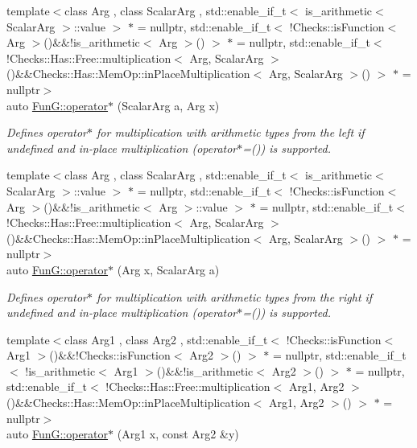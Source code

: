 \begin{DoxyCompactItemize}
{\footnotesize template$<$class Arg , class Scalar\-Arg , std\-::enable\-\_\-if\-\_\-t$<$ is\-\_\-arithmetic$<$ Scalar\-Arg $>$\-::value $>$ $\ast$  = nullptr, std\-::enable\-\_\-if\-\_\-t$<$ !\-Checks\-::is\-Function$<$ Arg $>$()\&\&!is\-\_\-arithmetic$<$ Arg $>$() $>$ $\ast$  = nullptr, std\-::enable\-\_\-if\-\_\-t$<$ !\-Checks\-::\-Has\-::\-Free\-::multiplication$<$ Arg, Scalar\-Arg $>$()\&\&\-Checks\-::\-Has\-::\-Mem\-Op\-::in\-Place\-Multiplication$<$ Arg, Scalar\-Arg $>$() $>$ $\ast$  = nullptr$>$ }\\auto \hyperlink{namespaceFunG_a9b303ce8718a6f64b035e7e782370734}{\-Fun\-G\-::operator$\ast$} (\-Scalar\-Arg a, \-Arg x)
\begin{DoxyCompactList}\small\item\em \-Defines operator$\ast$ for multiplication with arithmetic types from the left if undefined and in-\/place multiplication (operator$\ast$=()) is supported. \end{DoxyCompactList}\item 
{\footnotesize template$<$class Arg , class Scalar\-Arg , std\-::enable\-\_\-if\-\_\-t$<$ is\-\_\-arithmetic$<$ Scalar\-Arg $>$\-::value $>$ $\ast$  = nullptr, std\-::enable\-\_\-if\-\_\-t$<$ !\-Checks\-::is\-Function$<$ Arg $>$()\&\&!is\-\_\-arithmetic$<$ Arg $>$\-::value $>$ $\ast$  = nullptr, std\-::enable\-\_\-if\-\_\-t$<$ !\-Checks\-::\-Has\-::\-Free\-::multiplication$<$ Arg, Scalar\-Arg $>$()\&\&\-Checks\-::\-Has\-::\-Mem\-Op\-::in\-Place\-Multiplication$<$ Arg, Scalar\-Arg $>$() $>$ $\ast$  = nullptr$>$ }\\auto \hyperlink{namespaceFunG_a3cd5a2cb1abba842154691bb84aab896}{\-Fun\-G\-::operator$\ast$} (\-Arg x, \-Scalar\-Arg a)
\begin{DoxyCompactList}\small\item\em \-Defines operator$\ast$ for multiplication with arithmetic types from the right if undefined and in-\/place multiplication (operator$\ast$=()) is supported. \end{DoxyCompactList}\item 
{\footnotesize template$<$class Arg1 , class Arg2 , std\-::enable\-\_\-if\-\_\-t$<$ !\-Checks\-::is\-Function$<$ Arg1 $>$()\&\&!\-Checks\-::is\-Function$<$ Arg2 $>$() $>$ $\ast$  = nullptr, std\-::enable\-\_\-if\-\_\-t$<$ !is\-\_\-arithmetic$<$ Arg1 $>$()\&\&!is\-\_\-arithmetic$<$ Arg2 $>$() $>$ $\ast$  = nullptr, std\-::enable\-\_\-if\-\_\-t$<$ !\-Checks\-::\-Has\-::\-Free\-::multiplication$<$ Arg1, Arg2 $>$()\&\&\-Checks\-::\-Has\-::\-Mem\-Op\-::in\-Place\-Multiplication$<$ Arg1, Arg2 $>$() $>$ $\ast$  = nullptr$>$ }\\auto \hyperlink{namespaceFunG_ad023f2d2273af693f2b4ebceeb296dc8}{\-Fun\-G\-::operator$\ast$} (\-Arg1 x, const \-Arg2 \&y)

\end{DoxyCompactItemize}
